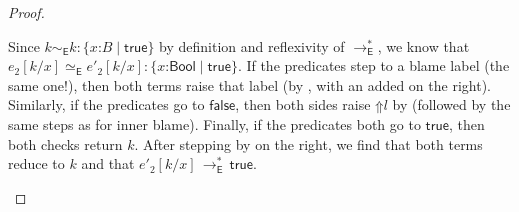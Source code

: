 \documentclass[9pt]{extarticle}
\newcommand{\ottnt}[1]{\mathit{#1}}
\begin{document}
\begin{lemma}
\begin{proof}
{\begin{itemize}
Since $ \ottnt{k}   \sim _{  \mathsf{E}  }  \ottnt{k}  :   \{ \mathit{x} \mathord{:} \ottnt{B} \mathrel{\mid}  \mathsf{true}  \}  $ by definition and reflexivity of
      $ \longrightarrow ^{*}_{  \mathsf{E}  } $, we know that $  \ottnt{e_{{\mathrm{2}}}}  [  \ottnt{k} / \mathit{x}  ]    \simeq _{  \mathsf{E}  }   \ottnt{e'_{{\mathrm{2}}}}  [  \ottnt{k} / \mathit{x}  ]   :   \{ \mathit{x} \mathord{:}  \mathsf{Bool}  \mathrel{\mid}  \mathsf{true}  \}  $.
If the predicates step to a blame label (the same one!), then
      both terms raise that label (by , with an added
       on the right). Similarly, if the predicates go
      to $ \mathsf{false} $, then both sides raise $ \mathord{\Uparrow}  \ottnt{l} $ by
       (followed by the same steps as for inner blame).
Finally, if the predicates both go to $ \mathsf{true} $, then both
      checks return $\ottnt{k}$. After stepping by  on the
      right, we find that both terms reduce to $\ottnt{k}$ and that
      $ \ottnt{e'_{{\mathrm{2}}}}  [  \ottnt{k} / \mathit{x}  ]  \,  \longrightarrow ^{*}_{  \mathsf{E}  }  \,  \mathsf{true} $.


\end{itemize}}
\end{proof}
\end{lemma}
\end{document}
